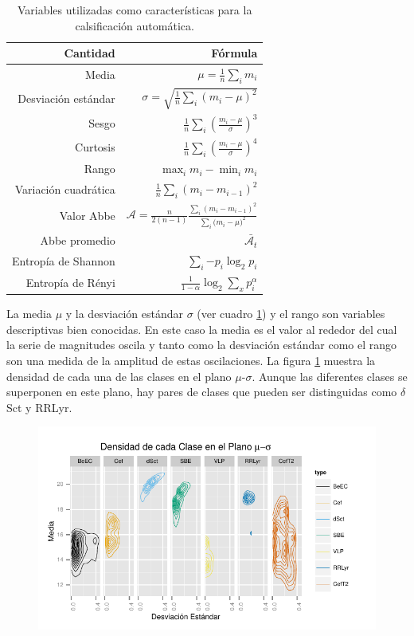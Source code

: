 \documentclass[letterpaper,12pt]{book}
\begin{document}
\begin{table}[ht]
  \centering
  \begin{tabular}{rr}
    \hline
    Cantidad & Fórmula  \\
    \hline
    Media& $\mu =\frac{1}{n}\sum_{i} m_{i}$ \\ 
    Desviación estándar& $\sigma = \sqrt{\frac{1}{n}\sum_{i} (m_{i}-\mu)^{2}}$ \\
    Sesgo & $\frac{1}{n}\sum_{i}{\left(\frac{m_{i}-\mu}{\sigma}\right)^{3}}$ \\
    Curtosis& $\frac{1}{n}\sum_{i}{\left(\frac{m_{i}-\mu}{\sigma}\right)^{4}}$ \\
    Rango& $\max_{i}m_{i} - \min_{i}m_{i}$ \\
    Variación cuadrática& $\frac{1}{n}\sum_{i}(m_{i}-m_{i-1})^{2}$ \\
    Valor Abbe \cite{mowlavi_searching_2014}& $\mathcal{A}=\frac{n}{2(n-1)}\frac{\sum_{i}{(m_{i}-m_{i-1})^{2}}}{\sum_{i}{(m_{i}-\mu})^2}$ \\
    Abbe promedio \cite{mowlavi_searching_2014}& $\bar{\mathcal{A}_{t}}$ \\
    Entropía de Shannon \cite{shannon_mathematical_1948} & $\sum_{i}{-p_{i}\log_{2}{p_{i}}}$ \\
    Entropía de Rényi\cite{renyi_measures_1961}& $\frac{1}{1-\alpha}\log_{2}{\sum_{x}p_{i}^{\alpha}}$\\
    \hline
  \end{tabular}
  \caption{Variables utilizadas como características para la calsificación automática.}
  \label{cuadro:variablesUtilizadas}
\end{table}


La media $\mu$ y la desviación estándar $\sigma$ (ver cuadro \ref{cuadro:variablesUtilizadas})  y el rango son variables descriptivas bien conocidas. En este caso la media es el valor al rededor del cual la serie de magnitudes oscila y tanto como la desviación estándar como el rango son una medida de la amplitud de estas oscilaciones. La figura \ref{fig:mediaDesv} muestra la densidad de cada una de las clases en el plano $\mu$-$\sigma$. Aunque las diferentes clases se superponen en este plano, hay pares de clases que pueden ser distinguidas como $\delta$Sct y RRLyr.


\begin{figure}
  \centering
  \includegraphics[width = \textwidth]{./img/CClasificacion/mediaDesv.pdf}
  \caption{}
  \label{fig:mediaDesv}
  \centering
\end{figure}
\end{document}
